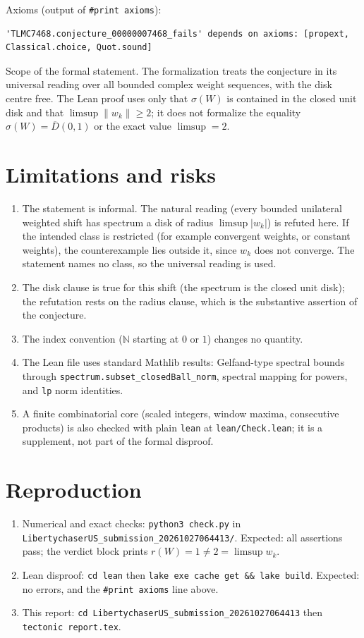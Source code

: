 \documentclass[11pt]{article}
\theoremstyle{definition}
\begin{document}
Axioms (output of \texttt{\#print axioms}):
\begin{lstlisting}
'TLMC7468.conjecture_00000007468_fails' depends on axioms: [propext, Classical.choice, Quot.sound]
\end{lstlisting}

Scope of the formal statement. The formalization treats the conjecture in its universal reading over all
bounded complex weight sequences, with the disk centre free. The Lean proof uses only that
$\sigma(W)$ is contained in the closed unit disk and that $\limsup\|w_k\|\ge 2$; it does not formalize
the equality $\sigma(W)=\overline{D}(0,1)$ or the exact value $\limsup=2$.

\section{Limitations and risks}

\begin{enumerate}
\item The statement is informal. The natural reading (every bounded unilateral weighted shift has spectrum a
disk of radius $\limsup|w_k|$) is refuted here. If the intended class is restricted (for example convergent
weights, or constant weights), the counterexample lies outside it, since $w_k$ does not converge.
The statement names no class, so the universal reading is used.
\item The disk clause is true for this shift (the spectrum is the closed unit disk); the refutation rests on the
radius clause, which is the substantive assertion of the conjecture.
\item The index convention ($\mathbb{N}$ starting at $0$ or $1$) changes no quantity.
\item The Lean file uses standard Mathlib results: Gelfand-type spectral bounds through
\texttt{spectrum.subset\_closedBall\_norm}, spectral mapping for powers, and \texttt{lp} norm identities.
\item A finite combinatorial core (scaled integers, window maxima, consecutive products) is also checked with plain
\texttt{lean} at \texttt{lean/Check.lean}; it is a supplement, not part of the formal disproof.
\end{enumerate}

\section{Reproduction}

\begin{enumerate}
\item Numerical and exact checks: \texttt{python3 check.py} in
\texttt{LibertychaserUS\_submission\_20261027064413/}. Expected: all assertions pass; the verdict block
prints $r(W)=1\neq 2=\limsup w_k$.
\item Lean disproof: \texttt{cd lean} then
\texttt{lake exe cache get \&\& lake build}. Expected: no errors, and the
\texttt{\#print axioms} line above.
\item This report: \texttt{cd LibertychaserUS\_submission\_20261027064413} then \texttt{tectonic report.tex}.
\end{enumerate}
\end{document}
